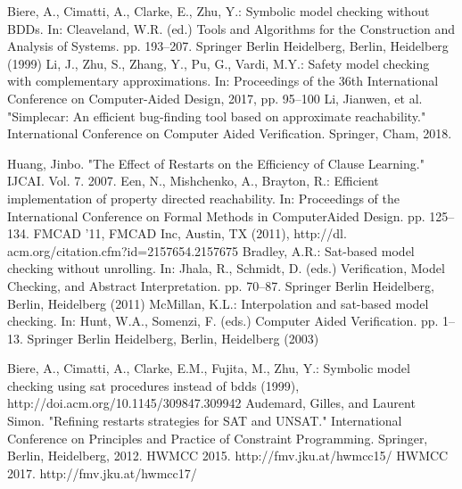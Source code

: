 \begin{thebibliography}{00}
 Biere, A., Cimatti, A., Clarke, E., Zhu, Y.: Symbolic model checking without BDDs. In: Cleaveland, W.R. (ed.) Tools and Algorithms for the Construction and Analysis of Systems. pp. 193–207. Springer Berlin Heidelberg, Berlin, Heidelberg (1999)
 Li, J., Zhu, S., Zhang, Y., Pu, G., Vardi, M.Y.: Safety model checking with complementary approximations. In: Proceedings of the 36th International Conference on Computer-Aided Design, 2017, pp. 95–100
 Li, Jianwen, et al. "Simplecar: An efficient bug-finding tool based on approximate reachability." International Conference on Computer Aided Verification. Springer, Cham, 2018.

 Huang, Jinbo. "The Effect of Restarts on the Efficiency of Clause Learning." IJCAI. Vol. 7. 2007.
 Een, N., Mishchenko, A., Brayton, R.: Efficient implementation of property directed reachability. In: Proceedings of the International Conference on Formal Methods in ComputerAided Design. pp. 125–134. FMCAD ’11, FMCAD Inc, Austin, TX (2011), http://dl. acm.org/citation.cfm?id=2157654.2157675
 Bradley, A.R.: Sat-based model checking without unrolling. In: Jhala, R., Schmidt, D. (eds.) Verification, Model Checking, and Abstract Interpretation. pp. 70–87. Springer Berlin Heidelberg, Berlin, Heidelberg (2011)
 McMillan, K.L.: Interpolation and sat-based model checking. In: Hunt, W.A., Somenzi, F. (eds.) Computer Aided Verification. pp. 1–13. Springer Berlin Heidelberg, Berlin, Heidelberg (2003)

 Biere, A., Cimatti, A., Clarke, E.M., Fujita, M., Zhu, Y.: Symbolic model checking using sat procedures instead of bdds (1999), http://doi.acm.org/10.1145/309847.309942
\bibitem{} Audemard, Gilles, and Laurent Simon. "Refining restarts strategies for SAT and UNSAT." International Conference on Principles and Practice of Constraint Programming. Springer, Berlin, Heidelberg, 2012.
\bibitem{} HWMCC 2015. http://fmv.jku.at/hwmcc15/
\bibitem{} HWMCC 2017. http://fmv.jku.at/hwmcc17/
\end{thebibliography}
